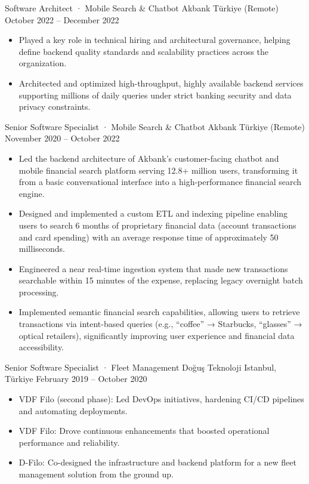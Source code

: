\resumeSubheading
  {Software Architect · Mobile Search \& Chatbot}
  {Akbank}
  {Türkiye (Remote)}
  {October 2022 -- December 2022}
\begin{itemize}
  \item Played a key role in technical hiring and architectural governance, helping define backend quality standards and scalability practices across the organization.
  \item Architected and optimized high-throughput, highly available backend services supporting millions of daily queries under strict banking security and data privacy constraints.
\end{itemize}
\vspace{0.3em}

\resumeSubheading
  {Senior Software Specialist · Mobile Search \& Chatbot}
  {Akbank}
  {Türkiye (Remote)}
  {November 2020 -- October 2022}
\begin{itemize}
  \item Led the backend architecture of Akbank’s customer-facing chatbot and mobile financial search platform serving 12.8+ million users, transforming it from a basic conversational interface into a high-performance financial search engine.
  \item Designed and implemented a custom ETL and indexing pipeline enabling users to search 6 months of proprietary financial data (account transactions and card spending) with an average response time of approximately 50 milliseconds.
  \item Engineered a near real-time ingestion system that made new transactions searchable within 15 minutes of the expense, replacing legacy overnight batch processing.
  \item Implemented semantic financial search capabilities, allowing users to retrieve transactions via intent-based queries (e.g., “coffee” → Starbucks, “glasses” → optical retailers), significantly improving user experience and financial data accessibility.
\end{itemize}
\vspace{0.3em}

\resumeSubheading
  {Senior Software Specialist · Fleet Management}
  {Doğuş Teknoloji}
  {Istanbul, Türkiye}
  {February 2019 -- October 2020}
\begin{itemize}
  \item VDF Filo (second phase): Led DevOps initiatives, hardening CI/CD pipelines and automating deployments.
  \item VDF Filo: Drove continuous enhancements that boosted operational performance and reliability.
  \item D-Filo: Co-designed the infrastructure and backend platform for a new fleet management solution from the ground up.
\end{itemize}
\vspace{0.3em}

